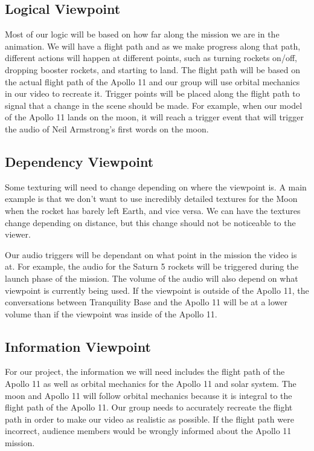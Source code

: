 \documentclass[onecolumn, draftclsnofoot,10pt, compsoc]{IEEEtran}
\begin{document}
    \subsection{Logical Viewpoint}

    Most of our logic will be based on how far along the mission we are in the animation. We will have a flight path and as we make progress along that path, different actions will happen at different points, such as turning rockets on/off, dropping booster rockets, and starting to land. The flight path will be based on the actual flight path of the Apollo 11 and our group will use orbital mechanics in our video to recreate it. Trigger points will be placed along the flight path to signal that a change in the scene should be made. For example, when our model of the Apollo 11 lands on the moon, it will reach a trigger event that will trigger the audio of Neil Armstrong's first words on the moon. 
    
    \subsection{Dependency Viewpoint}

    Some texturing will need to change depending on where the viewpoint is. A main example is that we don't want to use incredibly detailed textures for the Moon when the rocket has barely left Earth, and vice versa. We can have the textures change depending on distance, but this change should not be noticeable to the viewer.
    
    Our audio triggers will be dependant on what point in the mission the video is at. For example, the audio for the Saturn 5 rockets will be triggered during the launch phase of the mission. The volume of the audio will also depend on what viewpoint is currently being used. If the viewpoint is outside of the Apollo 11, the conversations between Tranquility Base and the Apollo 11 will be at a lower volume than if the viewpoint was inside of the Apollo 11.
    
    \subsection{Information Viewpoint}
    For our project, the information we will need includes the flight path of the Apollo 11 as well as orbital mechanics for the Apollo 11 and solar system. The moon and Apollo 11 will follow orbital mechanics because it is integral to the flight path of the Apollo 11. Our group needs to accurately recreate the flight path in order to make our video as realistic as possible. If the flight path were incorrect, audience members would be wrongly informed about the Apollo 11 mission.
\end{document}
